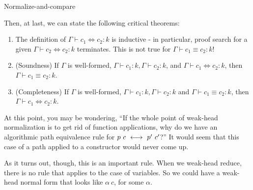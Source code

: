 \documentclass{amsart}
\newcommand{\type}{\ensuremath{\mathtt{type}}}
\begin{document}
\begin{section}{Normalize-and-compare}

    Then, at last, we can state the following critical theorems:

        \begin{enumerate}
            \item The definition of $\Gamma \vdash c_1 \iff c_2 : k$ is inductive - in particular, proof search for a given $\Gamma \vdash c_2 \iff c_2 : k$ terminates. This is not true for $\Gamma \vdash c_1 \equiv c_2 : k$!
            \item (Soundness) If $\Gamma$ is well-formed, $\Gamma \vdash c_1 : k, \Gamma \vdash c_2 : k$, and $\Gamma \vdash c_1 \iff c_2 : k$, then $\Gamma \vdash c_1 \equiv c_2 : k$.
            \item (Completeness) If $\Gamma$ is well-formed, $\Gamma \vdash c_1 : k, \Gamma \vdash c_2 : k$ and $\Gamma \vdash c_1 \equiv c_2 : k$, then $\Gamma \vdash c_1 \iff c_2 : k$.
        \end{enumerate}

    At this point, you may be wondering, ``If the whole point of weak-head
    normalization is to get rid of function applications, why do we have an
    algorithmic path equivalence rule for \(p \ c \ \longleftrightarrow\  p' \ c'\)?'' It would
    seem that this case of a path applied to a constructor would never come up.

    As it turns out, though, this is an important rule. When we weak-head
    reduce, there is no rule that applies to the case of variables. So we could
    have a weak-head normal form that looks like \(\alpha \ c\), for some
    \(\alpha\).


\end{section}
\end{document}
